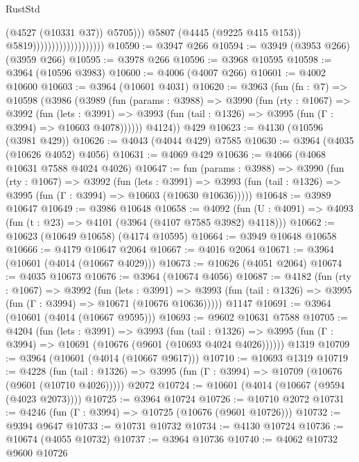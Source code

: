 \begin{lexlean}{RustStd}
\begin{coremodule}
{\begin{coremodule}
{{{{{{{{{{{{{{{{{{{{{{{{{{{{{{{{{{{{{{                                                (@4527 (@10331 @37))
                                                @5705)))
                                          @5807
                                          (@4445 (@9225 @415 @153))
                                          @5819)))))))))))))))))))
@10590 := @3947 @266
@10594 := @3949 (@3953 @266) (@3959 @266)
@10595 := @3978 @266
@10596 := @3968 @10595
@10598 := @3964 (@10596 @3983)
@10600 := @4006 (@4007 @266)
@10601 := @4002 @10600
@10603 := @3964 (@10601 @4031)
@10620 := @3963
    (fun (fn : @7) =>
    @10598
      (@3986
        (@3989
          (fun (params : @3988) =>
          @3990
            (fun (rty : @1067) =>
            @3992
              (fun (lets : @3991) =>
              @3993 (fun (tail : @1326) => @3995 (fun (Γ : @3994) => @10603 @4078))))))
        @4124))
    @429
@10623 := @4130 (@10596 (@3981 @429))
@10626 := @4043 (@4044 @429) @7585
@10630 := @3964 (@4035 (@10626 @4052) @4056)
@10631 := @4069 @429
@10636 := @4066 (@4068 @10631 @7588 @4024 @4026)
@10647 := fun (params : @3988) =>
  @3990
    (fun (rty : @1067) =>
    @3992
      (fun (lets : @3991) =>
      @3993 (fun (tail : @1326) => @3995 (fun (Γ : @3994) => @10603 (@10630 @10636)))))
@10648 := @3989 @10647
@10649 := @3986 @10648
@10658 := @4092
    (fun (U : @4091) => @4093 (fun (t : @23) => @4101 (@3964 (@4107 @7585 @3982) @4118)))
@10662 := @10623 (@10649 @10658) (@4174 @10595)
@10664 := @3949 @10648 @10658
@10666 := @4179 @10647 @2064
@10667 := @4016 @2064
@10671 := @3964 (@10601 (@4014 (@10667 @4029)))
@10673 := @10626 (@4051 @2064)
@10674 := @4035 @10673
@10676 := @3964 (@10674 @4056)
@10687 := @4182
    (fun (rty : @1067) =>
    @3992
      (fun (lets : @3991) =>
      @3993 (fun (tail : @1326) => @3995 (fun (Γ : @3994) => @10671 (@10676 @10636)))))
    @1147
@10691 := @3964 (@10601 (@4014 (@10667 @9595)))
@10693 := @9602 @10631 @7588
@10705 := @4204
    (fun (lets : @3991) =>
    @3993
      (fun (tail : @1326) =>
      @3995 (fun (Γ : @3994) => @10691 (@10676 (@9601 (@10693 @4024 @4026))))))
    @1319
@10709 := @3964 (@10601 (@4014 (@10667 @9617)))
@10710 := @10693 @1319
@10719 := @4228
    (fun (tail : @1326) => @3995 (fun (Γ : @3994) => @10709 (@10676 (@9601 (@10710 @4026)))))
    @2072
@10724 := @10601 (@4014 (@10667 (@9594 (@4023 @2073))))
@10725 := @3964 @10724
@10726 := @10710 @2072
@10731 := @4246 (fun (Γ : @3994) => @10725 (@10676 (@9601 @10726)))
@10732 := @9394 @9647
@10733 := @10731 @10732
@10734 := @4130 @10724
@10736 := @10674 (@4055 @10732)
@10737 := @3964 @10736
@10740 := @4062 @10732 @9600 @10726
}}}}}}}}}}}}}}}}}}}}}}}}}}}}}}}}}}}}}}
\end{coremodule}}
\end{coremodule}
\end{lexlean}
